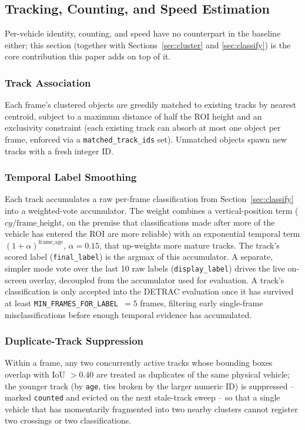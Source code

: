 \documentclass[conference]{IEEEtran}
\newcommand{\code}[1]{\texttt{#1}}
\begin{document}
\subsection{Tracking, Counting, and Speed Estimation}
\label{sec:tracking}

Per-vehicle identity, counting, and speed have no counterpart in the
baseline \cite{baseline} either; this section (together with
Sections~\ref{sec:cluster} and \ref{sec:classify}) is the core
contribution this paper adds on top of it.

\subsubsection{Track Association}
Each frame's clustered objects are greedily matched to existing tracks
by nearest centroid, subject to a maximum distance of half the ROI
height and an exclusivity constraint (each existing track can absorb at
most one object per frame, enforced via a \code{matched\_track\_ids}
set). Unmatched objects spawn new tracks with a fresh integer ID.

\subsubsection{Temporal Label Smoothing}
Each track accumulates a raw per-frame classification from
Section~\ref{sec:classify} into a weighted-vote accumulator. The weight
combines a vertical-position term ($cy / \text{frame\_height}$, on the
premise that classifications made after more of the vehicle has entered
the ROI are more reliable) with an exponential temporal term
$(1+\alpha)^{\text{frame\_age}}$, $\alpha=0.15$, that up-weights more
mature tracks. The track's scored label (\code{final\_label}) is the
argmax of this accumulator. A separate, simpler mode vote over the last
10 raw labels (\code{display\_label}) drives the live on-screen overlay,
decoupled from the accumulator used for evaluation. A track's
classification is only accepted into the DETRAC evaluation once it has
survived at least \code{MIN\_FRAMES\_FOR\_LABEL}~$=5$ frames, filtering
early single-frame misclassifications before enough temporal evidence
has accumulated.

\subsubsection{Duplicate-Track Suppression}
Within a frame, any two concurrently active tracks whose bounding boxes
overlap with IoU $>0.40$ are treated as duplicates of the same physical
vehicle; the younger track (by \code{age}, ties broken by the larger
numeric ID) is suppressed -- marked \code{counted} and evicted on the
next stale-track sweep -- so that a single vehicle that has momentarily
fragmented into two nearby clusters cannot register two crossings or
two classifications.
\end{document}
